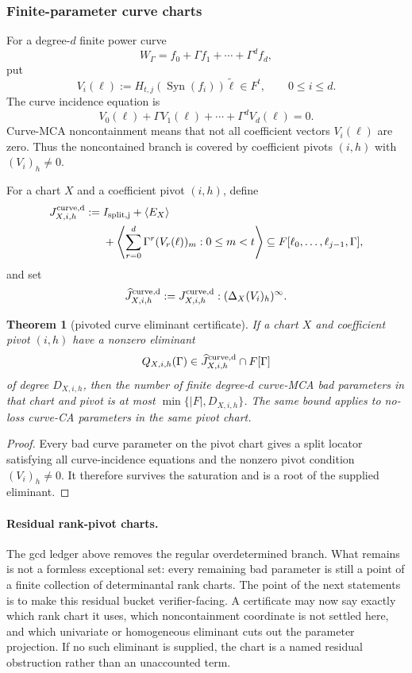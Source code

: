 \documentclass[11pt]{article}
\newtheorem{theorem}{Theorem}[section]
\theoremstyle{definition}
\theoremstyle{remark}
\newcommand{\Syn}{\operatorname{Syn}}
\begin{document}
\subsubsection{Finite-parameter curve charts}

For a degree-$d$ finite power curve
\[
        W_\Gamma=f_0+\Gamma f_1+\cdots+\Gamma^d f_d,
\]
put
\[
        V_i(\ell):=H_{t,j}(\Syn(f_i))\widetilde\ell\in F^t,
        \qquad 0\le i\le d .
\]
The curve incidence equation is
\[
        V_0(\ell)+\Gamma V_1(\ell)+\cdots+\Gamma^d V_d(\ell)=0 .
\]
Curve-MCA noncontainment means that not all coefficient vectors $V_i(\ell)$ are
zero.  Thus the noncontained branch is covered by coefficient pivots
$(i,h)$ with $(V_i)_h\ne0$.

For a chart $X$ and a coefficient pivot $(i,h)$, define
\[
\begin{aligned}
        J^{\rm curve,d}_{X,i,h}:={}&
        I_{\rm split,j}+\langle E_X\rangle \\
        &+\left\langle
          \sum_{r=0}^d \Gamma^r (V_r(\ell))_m:
          0\le m<t
          \right\rangle
        \subseteq F[\ell_0,\ldots,\ell_{j-1},\Gamma],
\end{aligned}
\]
and set
\[
        \widehat J^{\rm curve,d}_{X,i,h}
        :=J^{\rm curve,d}_{X,i,h}:(\Delta_X (V_i)_h)^\infty .
\]

\begin{theorem}[pivoted curve eliminant certificate]
\label{thm:aperiodic-curve-eliminant}
If a chart $X$ and coefficient pivot $(i,h)$ have a nonzero eliminant
\[
        Q_{X,i,h}(\Gamma)\in
        \widehat J^{\rm curve,d}_{X,i,h}\cap F[\Gamma]
\]
of degree $D_{X,i,h}$, then the number of finite degree-$d$ curve-MCA bad
parameters in that chart and pivot is at most $\min\{|F|,D_{X,i,h}\}$.  The same
bound applies to no-loss curve-CA parameters in the same pivot chart.
\end{theorem}

\begin{proof}
Every bad curve parameter on the pivot chart gives a split locator satisfying all
curve-incidence equations and the nonzero pivot condition $(V_i)_h\ne0$.  It
therefore survives the saturation and is a root of the supplied eliminant.
\end{proof}

\paragraph{Residual rank-pivot charts.}
The gcd ledger above removes the regular overdetermined branch.  What remains is
not a formless exceptional set: every remaining bad parameter is still a point of
a finite collection of determinantal rank charts.  The point of the next
statements is to make this residual bucket verifier-facing.  A certificate may
now say exactly which rank chart it uses, which noncontainment coordinate is
not settled here, and which univariate or homogeneous eliminant cuts out the parameter
projection.  If no such eliminant is supplied, the chart is a named residual
obstruction rather than an unaccounted term.
\end{document}
